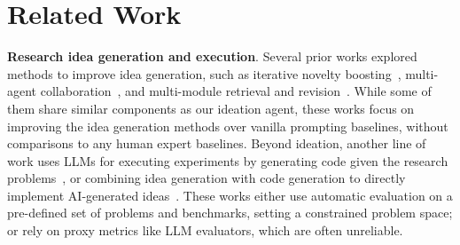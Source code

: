 \section{Related Work}
\label{sec:related}


\textbf{Research idea generation and execution}.
Several prior works explored methods to improve idea generation, such as iterative novelty boosting~\cite{Wang2023SciMONSI}, multi-agent collaboration~\cite{Baek2024ResearchAgentIR}, and multi-module retrieval and revision~\cite{Yang2023LargeLM}. 
While some of them share similar components as our ideation agent, these works focus on improving the idea generation methods over vanilla prompting baselines, without comparisons to any human expert baselines. 
Beyond ideation, another line of work uses LLMs for executing experiments by generating code given the research problems~\cite{Huang2023MLAgentBenchEL,Tian2024SciCodeAR}, or combining idea generation with code generation to directly implement AI-generated ideas~\cite{AIScientist,Li2024MLRCopilotAM}. 
These works either use automatic evaluation on a pre-defined set of problems and benchmarks, setting a constrained problem space; or rely on proxy metrics like LLM evaluators, which are often unreliable. 




